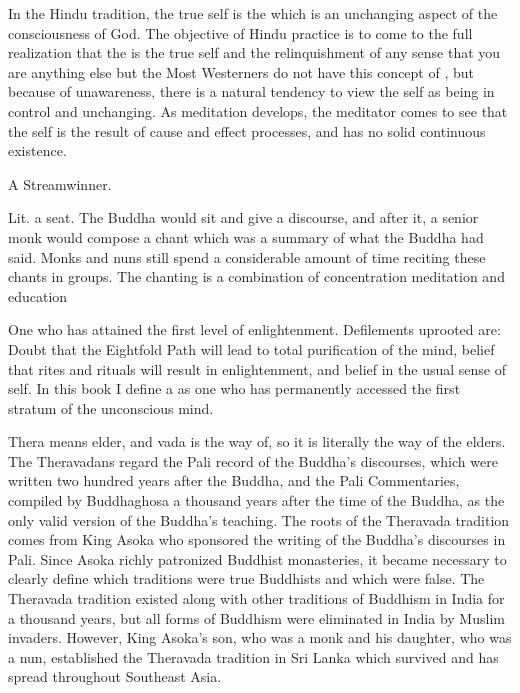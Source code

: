 \documentclass[a5paper,10pt,english]{book}
\begin{document}
\begin{description}
\sphinxAtStartPar
In the Hindu tradition, the true self is the  which is an
unchanging aspect of the consciousness of God. The objective of Hindu
practice is to come to the full realization that the  is the
true self and the relinquishment of any sense that you are anything else
but the  Most Westerners do not have this concept of ,
but because of unawareness, there is a natural tendency to view the
self as being in control and unchanging. As  meditation
develops, the meditator comes to see that the self is the result of
cause and effect processes, and has no solid continuous existence.

\sphinxAtStartPar
A Stream\sphinxhyphen{}winner.

\sphinxAtStartPar
Lit. a seat. The Buddha would sit and give a discourse, and after
it, a senior monk would compose a chant which was a summary of what the
Buddha had said. Monks and nuns still spend a considerable amount of
time reciting these chants in groups. The chanting is a combination of
concentration meditation and education

\sphinxAtStartPar
One who has attained the first level of enlightenment.
Defilements uprooted are: Doubt that the Eightfold Path will lead to
total purification of the mind, belief that rites and rituals will
result in enlightenment, and belief in the usual sense of self. In this
book I define a  as one who has permanently accessed
the first stratum of the unconscious mind.

\sphinxAtStartPar
Thera means elder, and vada is the way of, so it is literally
the way of the elders. The Theravadans regard the Pali record of the
Buddha’s discourses, which were written two hundred years after the
Buddha, and the Pali Commentaries, compiled by Buddhaghosa a thousand
years after the time of the Buddha, as the only valid version of the
Buddha’s teaching. The roots of the Theravada tradition comes from King
Asoka who sponsored the writing of the Buddha’s discourses in Pali.
Since Asoka richly patronized Buddhist monasteries, it became necessary
to clearly define which traditions were true Buddhists and which were
false. The Theravada tradition existed along with other traditions of
Buddhism in India for a thousand years, but all forms of Buddhism were
eliminated in India by Muslim invaders. However, King Asoka’s son, who
was a monk and his daughter, who was a nun, established the Theravada
tradition in Sri Lanka which survived and has spread throughout
Southeast Asia.


\end{description}
\end{document}
